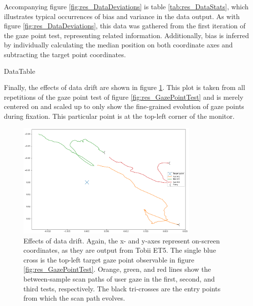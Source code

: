 Accompanying figure \ref{fig:res_DataDeviations} is table \ref{tab:res_DataStats}, which illustrates typical occurrences of bias and variance in the data output. As with figure \ref{fig:res_DataDeviations}, this data was gathered from the first iteration of the gaze point test, representing related information. Additionally, bias is inferred by individually calculating the median position on both coordinate axes and subtracting the target point coordinates.

{DataTable}

\newpage
Finally, the effects of data drift are shown in figure \ref{fig:res_DataDrift}. This plot is taken from all repetitions of the gaze point test of figure \ref{fig:res_GazePointTest} and is merely centered on and scaled up to only show the fine-grained evolution of gaze points during fixation. This particular point is at the top-left corner of the monitor. 

\begin{figure}[h]
    \centering
    \includegraphics[width=0.8\textwidth]{Images/DataQuality/DataDrift.png}
    \caption{Effects of data drift. Again, the x- and y-axes represent on-screen coordinates, as they are output from Tobii ET5. The single blue cross is the top-left target gaze point observable in figure \ref{fig:res_GazePointTest}. Orange, green, and red lines show the between-sample scan paths of user gaze in the first, second, and third tests, respectively. The black tri-crosses are the entry points from which the scan path evolves.}
    \label{fig:res_DataDrift}
\end{figure}



